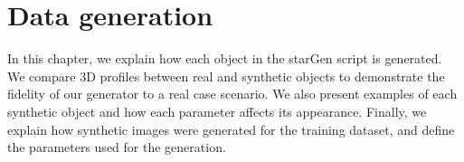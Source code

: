 \chapter{Data generation}

In this chapter, we explain how each object in the starGen script is generated. We compare 3D profiles between real and synthetic objects to demonstrate the fidelity of our generator to a real case scenario. We also present examples of each synthetic object and how each parameter affects its appearance. Finally, we explain how synthetic images were generated for the training dataset, and define the parameters used for the generation. 


